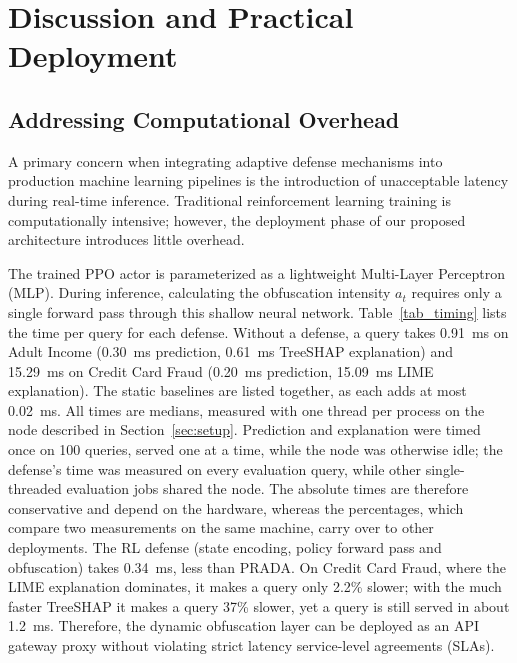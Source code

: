 \documentclass[conference]{IEEEtran}
\DeclareRobustCommand{\rev}[1]{#1}
\DeclareRobustCommand{\revnew}[1]{#1}
\begin{document}
\section{Discussion and Practical Deployment}

\subsection{Addressing Computational Overhead}
A primary concern when integrating adaptive defense mechanisms into production machine learning pipelines is the introduction of unacceptable latency during real-time inference. Traditional reinforcement learning training is computationally intensive; however, the deployment phase of our proposed architecture introduces \rev{little} overhead.

The trained PPO actor is parameterized as a lightweight Multi-Layer Perceptron (MLP). During inference, calculating the obfuscation intensity $a_t$ requires only a single forward pass through this shallow neural network. \rev{\revnew{Table~\ref{tab_timing} lists the time per query for each defense. Without a defense, a query takes 0.91~ms on Adult Income (0.30~ms prediction, 0.61~ms TreeSHAP explanation) and 15.29~ms on Credit Card Fraud (0.20~ms prediction, 15.09~ms LIME explanation). The static baselines are listed together, as each adds at most 0.02~ms. All times are medians, measured with one thread per process on the node described in Section~\ref{sec:setup}. Prediction and explanation were timed once on 100 queries, served one at a time, while the node was otherwise idle; the defense's time was measured on every evaluation query, while other single-threaded evaluation jobs shared the node. The absolute times are therefore conservative and depend on the hardware, whereas the percentages, which compare two measurements on the same machine, carry over to other deployments.} The RL defense (state encoding, policy forward pass and obfuscation) takes 0.34~ms, less than PRADA. \revnew{On Credit Card Fraud, where the LIME explanation dominates, it makes a query only 2.2\% slower; with the much faster TreeSHAP it makes a query 37\% slower,} yet a query is still served in about 1.2~ms.} Therefore, the dynamic obfuscation layer can be deployed as an API gateway proxy without violating strict latency service-level agreements (SLAs).
\end{document}
